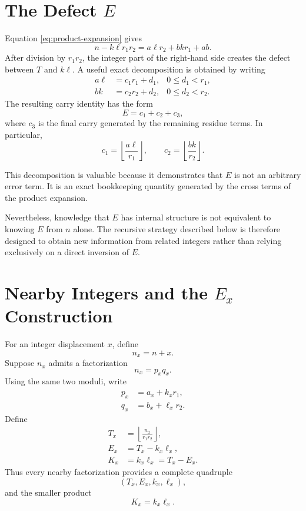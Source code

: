 \documentclass[11pt,a4paper]{article}
\begin{document}
\section{The Defect $E$}

Equation \eqref{eq:product-expansion} gives
\[
    n-k\ell r_1r_2
    =a\ell r_2+bk r_1+ab.
\]
After division by $r_1r_2$, the integer part of the right-hand side creates
the defect between $T$ and $k\ell$.
A useful exact decomposition is obtained by writing
\begin{align}
    a\ell &= c_1r_1+d_1,
        &0\le d_1<r_1,\\
    bk &= c_2r_2+d_2,
        &0\le d_2<r_2.
\end{align}
The resulting carry identity has the form
\begin{equation}
\label{eq:E-carry}
    E=c_1+c_2+c_3,
\end{equation}
where $c_3$ is the final carry generated by the remaining residue terms.
In particular,
\[
    c_1=\left\lfloor\frac{a\ell}{r_1}\right\rfloor,
    \qquad
    c_2=\left\lfloor\frac{bk}{r_2}\right\rfloor.
\]

This decomposition is valuable because it demonstrates that $E$ is not an
arbitrary error term. It is an exact bookkeeping quantity generated by the
cross terms of the product expansion.

Nevertheless, knowledge that $E$ has internal structure is not equivalent
to knowing $E$ from $n$ alone. The recursive strategy described below is
therefore designed to obtain new information from related integers rather
than relying exclusively on a direct inversion of $E$.

\section{Nearby Integers and the $E_x$ Construction}

For an integer displacement $x$, define
\[
    n_x=n+x.
\]
Suppose $n_x$ admits a factorization
\[
    n_x=p_xq_x.
\]
Using the same two moduli, write
\begin{align}
    p_x &= a_x+k_xr_1,\\
    q_x &= b_x+\ell_xr_2.
\end{align}
Define
\begin{align}
    T_x&=\left\lfloor\frac{n_x}{r_1r_2}\right\rfloor,\\
    E_x&=T_x-k_x\ell_x,\\
    K_x&=k_x\ell_x=T_x-E_x.
\end{align}
Thus every nearby factorization provides a complete quadruple
\[
    (T_x,E_x,k_x,\ell_x),
\]
and the smaller product
\[
    K_x=k_x\ell_x.
\]
\end{document}
